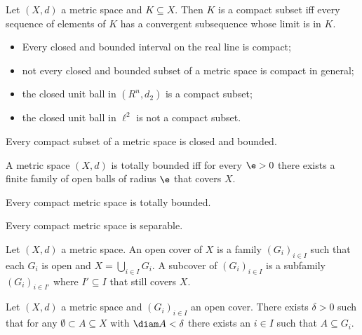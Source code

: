 \documentclass{article}
\begin{document}
\begin{definition}
	Let $(X,d)$ a metric space and $K\subseteq X$. Then $K$ is a compact subset iff
	every sequence of elements of $K$ has a convergent subsequence whose limit is in
	$K$.
\end{definition}
\begin{itemize}
	\item Every closed and bounded interval on the real line is compact;
	\item not every closed and bounded subset of a metric space is compact in general;
	\item the closed unit ball in $(R^n,d_2)$ is a compact subset;
	\item the closed unit ball in $\ell^2$ is not a compact subset.
\end{itemize}

\begin{proposition}[9.7, 9.8]
	Every compact subset of a metric space is closed and bounded.
\end{proposition}

\begin{definition}
	A metric space $(X,d)$ is totally bounded iff for every $\e>0$ there exists a
	finite family of open balls of radius $\e$ that covers $X$.
\end{definition}

\begin{proposition}[9.13]
	Every compact metric space is totally bounded.
\end{proposition}

\begin{proposition}[9.14]
	Every compact metric space is separable.
\end{proposition}

\begin{definition}
	Let $(X,d)$ a metric space. An open cover of $X$ is a family $(G_i)_{i\in I}$ such
	that each $G_i$ is open and $X=\bigcup_{i\in I}G_i$. A subcover of $(G_i)_{i\in I}$
	is a subfamily $(G_i)_{i\in I'}$ where $I'\subseteq I$ that still covers $X$.
\end{definition}

\begin{proposition}
	Let $(X,d)$ a metric space and $(G_i)_{i\in I}$ an open cover. There exists
	$\delta>0$ such that for any $\emptyset\subset A\subseteq X$ with $\diam A < \delta$
	there exists an $i\in I$ such that $A\subseteq G_i$.
\end{proposition}
\end{document}
